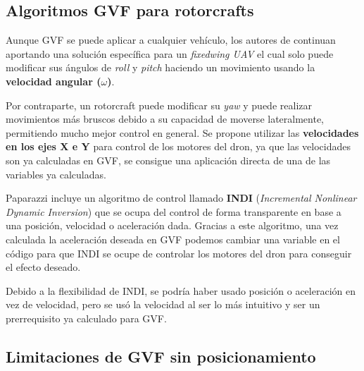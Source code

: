
\subsection{Algoritmos GVF para rotorcrafts}

Aunque GVF se puede aplicar a cualquier vehículo, los autores de \cite{gvf-hector}
continuan aportando una solución específica para un \textit{fixedwing UAV} 
el cual solo puede modificar sus ángulos de \textit{roll} y \textit{pitch} 
haciendo un movimiento usando la \textbf{velocidad angular ($\omega$)}. 

Por contraparte, un rotorcraft puede modificar su \textit{yaw} y 
puede realizar movimientos más bruscos debido a su capacidad de moverse lateralmente, 
permitiendo mucho mejor control en general. 
Se propone utilizar las \textbf{velocidades en los ejes X e Y} para control de los motores del dron,
ya que las velocidades son ya calculadas en GVF, 
se consigue una aplicación directa de una de las variables ya calculadas. 

Paparazzi incluye un algoritmo de control llamado \textbf{INDI} (\textit{Incremental Nonlinear Dynamic Inversion})
\cite{indi-paparazzi}
que se ocupa del control de forma transparente en base a una posición, velocidad o aceleración dada. 
Gracias a este algoritmo, una vez calculada la aceleración deseada en GVF 
podemos cambiar una variable en el código para que INDI se ocupe de controlar los
motores del dron para conseguir el efecto deseado. 

Debido a la flexibilidad de INDI, se podría haber usado posición o aceleración en vez de velocidad,
pero se usó la velocidad al ser lo más intuitivo y ser un prerrequisito ya calculado para GVF.


\subsection{Limitaciones de GVF sin posicionamiento}

